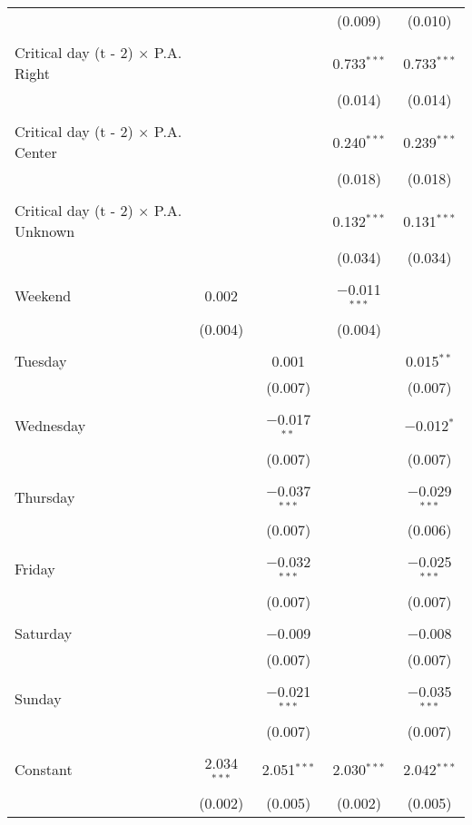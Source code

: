 \documentclass[
]{article}
\begin{document}
\begin{table}[!htbp]
{\begin{tabular}{@{\extracolsep{5pt}}lcccc}
  &  &  & (0.009) & (0.010) \\ 
  & & & & \\ 
 Critical day (t - 2) $\times$ P.A. Right &  &  & 0.733$^{***}$ & 0.733$^{***}$ \\ 
  &  &  & (0.014) & (0.014) \\ 
  & & & & \\ 
 Critical day (t - 2) $\times$ P.A. Center &  &  & 0.240$^{***}$ & 0.239$^{***}$ \\ 
  &  &  & (0.018) & (0.018) \\ 
  & & & & \\ 
 Critical day (t - 2) $\times$ P.A. Unknown &  &  & 0.132$^{***}$ & 0.131$^{***}$ \\ 
  &  &  & (0.034) & (0.034) \\ 
  & & & & \\ 
 Weekend & 0.002 &  & $-$0.011$^{***}$ &  \\ 
  & (0.004) &  & (0.004) &  \\ 
  & & & & \\ 
 Tuesday &  & 0.001 &  & 0.015$^{**}$ \\ 
  &  & (0.007) &  & (0.007) \\ 
  & & & & \\ 
 Wednesday &  & $-$0.017$^{**}$ &  & $-$0.012$^{*}$ \\ 
  &  & (0.007) &  & (0.007) \\ 
  & & & & \\ 
 Thursday &  & $-$0.037$^{***}$ &  & $-$0.029$^{***}$ \\ 
  &  & (0.007) &  & (0.006) \\ 
  & & & & \\ 
 Friday &  & $-$0.032$^{***}$ &  & $-$0.025$^{***}$ \\ 
  &  & (0.007) &  & (0.007) \\ 
  & & & & \\ 
 Saturday &  & $-$0.009 &  & $-$0.008 \\ 
  &  & (0.007) &  & (0.007) \\ 
  & & & & \\ 
 Sunday &  & $-$0.021$^{***}$ &  & $-$0.035$^{***}$ \\ 
  &  & (0.007) &  & (0.007) \\ 
  & & & & \\ 
 Constant & 2.034$^{***}$ & 2.051$^{***}$ & 2.030$^{***}$ & 2.042$^{***}$ \\ 
  & (0.002) & (0.005) & (0.002) & (0.005) \\ 

\end{tabular}}
\end{table}
\end{document}
